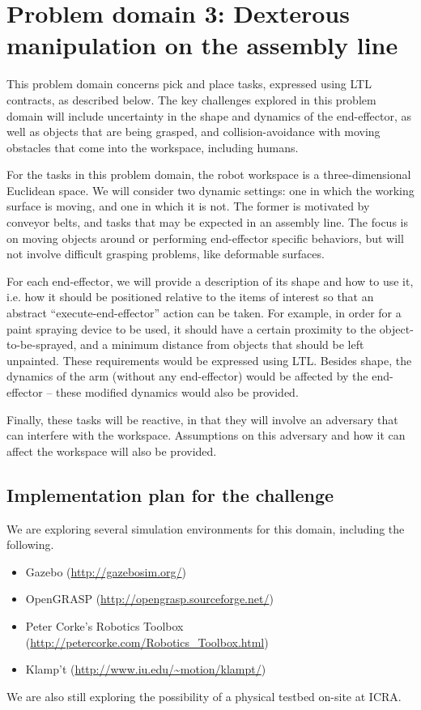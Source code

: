 \documentclass[12pt]{amsart}
\begin{document}
\section{Problem domain 3: Dexterous manipulation on the assembly line}\label{sec:dexterousmanip}

This problem domain concerns pick and place tasks, expressed using LTL
contracts, as described below. The key challenges explored in this problem
domain will include uncertainty in the shape and dynamics of the end-effector,
as well as objects that are being grasped, and collision-avoidance with moving
obstacles that come into the workspace, including humans.

For the tasks in this problem domain, the robot workspace is a three-dimensional
Euclidean space. We will consider two dynamic settings: one in which the working
surface is moving, and one in which it is not.  The former is motivated by
conveyor belts, and tasks that may be expected in an assembly line. The focus is
on moving objects around or performing end-effector specific behaviors, but will
not involve difficult grasping problems, like deformable surfaces.

For each end-effector, we will provide a description of its shape and how to use
it, i.e.  how it should be positioned relative to the items of interest so that
an abstract ``execute-end-effector'' action can be taken. For example, in order
for a paint spraying device to be used, it should have a certain proximity to
the object-to-be-sprayed, and a minimum distance from objects that should be
left unpainted. These requirements would be expressed using LTL. Besides shape,
the dynamics of the arm (without any end-effector) would be affected by the
end-effector -- these modified dynamics would also be provided.

Finally, these tasks will be reactive, in that they will involve an adversary
that can interfere with the workspace. Assumptions on this adversary and how it
can affect the workspace will also be provided.

\subsection{Implementation plan for the challenge}

We are exploring several simulation environments for this domain, including the following.
\begin{itemize}
\item Gazebo (\url{http://gazebosim.org/})
\item OpenGRASP (\url{http://opengrasp.sourceforge.net/})
\item Peter Corke's Robotics Toolbox
(\url{http://petercorke.com/Robotics_Toolbox.html})
\item Klamp't (\url{http://www.iu.edu/~motion/klampt/})
\end{itemize}

We are also still exploring the possibility of a physical testbed on-site at ICRA.




\end{document}
